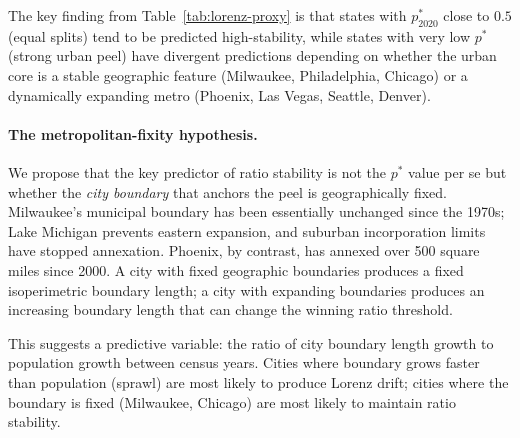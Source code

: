 The key finding from Table~\ref{tab:lorenz-proxy} is that states with
$p^*_{2020}$ close to $0.5$ (equal splits) tend to be predicted high-stability,
while states with very low $p^*$ (strong urban peel) have divergent predictions
depending on whether the urban core is a stable geographic feature
(Milwaukee, Philadelphia, Chicago) or a dynamically expanding metro
(Phoenix, Las Vegas, Seattle, Denver).

\paragraph{The metropolitan-fixity hypothesis.}
We propose that the key predictor of ratio stability is not the $p^*$ value
per se but whether the \emph{city boundary} that anchors the peel is
geographically fixed.
Milwaukee's municipal boundary has been essentially unchanged since the 1970s;
Lake Michigan prevents eastern expansion, and suburban incorporation limits
have stopped annexation.
Phoenix, by contrast, has annexed over 500 square miles since 2000.
A city with fixed geographic boundaries produces a fixed isoperimetric
boundary length; a city with expanding boundaries produces an increasing
boundary length that can change the winning ratio threshold.

This suggests a predictive variable: the ratio of city boundary length growth
to population growth between census years.
Cities where boundary grows faster than population (sprawl) are most likely
to produce Lorenz drift; cities where the boundary is fixed (Milwaukee, Chicago)
are most likely to maintain ratio stability.
